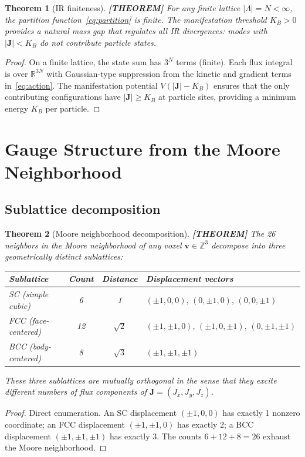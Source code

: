 \documentclass[11pt]{article}
\theoremstyle{tight}
\newtheorem{theorem}{Theorem}[section]
\theoremstyle{plainroman}
\newcommand{\R}{\mathbb{R}}
\newcommand{\Z}{\mathbb{Z}}
\begin{document}
\begin{theorem}[IR finiteness]\label{thm:IR}
\textbf{[THEOREM]}
For any finite lattice $|\Lambda|=N<\infty$, the partition function~\eqref{eq:partition} is finite.
The manifestation threshold $K_B>0$ provides a natural mass gap that regulates all IR divergences: modes with $|\mathbf J|<K_B$ do not contribute particle states.
\end{theorem}
\begin{proof}
On a finite lattice, the state sum has $3^N$ terms (finite).
Each flux integral is over $\R^{3N}$ with Gaussian-type suppression from the kinetic and gradient terms in~\eqref{eq:action}.
The manifestation potential $V(|\mathbf J|-K_B)$ ensures that the only contributing configurations have $|\mathbf J|\ge K_B$ at particle sites, providing a minimum energy $K_B$ per particle.
\end{proof}

\section{Gauge Structure from the Moore Neighborhood}

\subsection{Sublattice decomposition}

\begin{theorem}[Moore neighborhood decomposition]\label{thm:moore}
\textbf{[THEOREM]}
The 26 neighbors in the Moore neighborhood of any voxel $\mathbf v\in\Z^3$ decompose into three geometrically distinct sublattices:
\begin{center}
\renewcommand{\arraystretch}{1.2}
\begin{tabular}{lccl}
\toprule
\textbf{Sublattice} & \textbf{Count} & \textbf{Distance} & \textbf{Displacement vectors} \\
\midrule
SC (simple cubic) & 6 & 1 & $(\pm 1,0,0),\,(0,\pm 1,0),\,(0,0,\pm 1)$ \\
FCC (face-centered) & 12 & $\sqrt{2}$ & $(\pm 1,\pm 1,0),\,(\pm 1,0,\pm 1),\,(0,\pm 1,\pm 1)$ \\
BCC (body-centered) & 8 & $\sqrt{3}$ & $(\pm 1,\pm 1,\pm 1)$ \\
\bottomrule
\end{tabular}
\end{center}
These three sublattices are mutually orthogonal in the sense that they excite different numbers of flux components of $\mathbf J=(J_x,J_y,J_z)$.
\end{theorem}
\begin{proof}
Direct enumeration.
An SC displacement $(\pm 1,0,0)$ has exactly 1 nonzero coordinate; an FCC displacement $(\pm 1,\pm 1,0)$ has exactly 2; a BCC displacement $(\pm 1,\pm 1,\pm 1)$ has exactly 3.
The counts $6+12+8=26$ exhaust the Moore neighborhood.
\end{proof}
\end{document}
